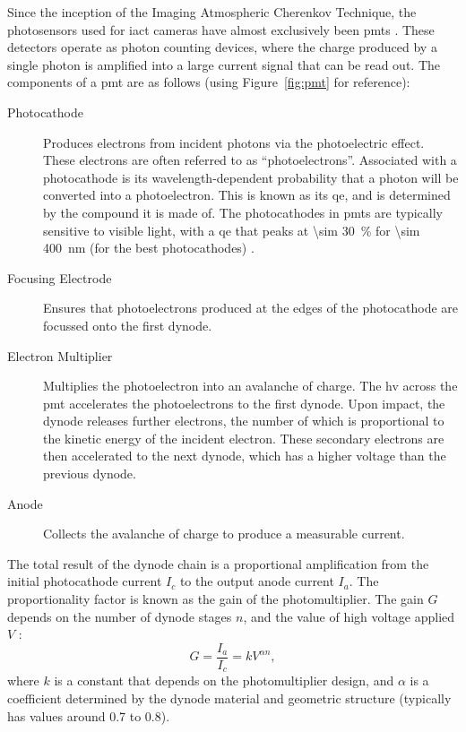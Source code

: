 Since the inception of the Imaging Atmospheric Cherenkov Technique, the photosensors used for \gls{iact} cameras have almost exclusively been \glspl{pmt} \cite{Weekes2003}. These detectors operate as photon counting devices, where the charge produced by a single photon is amplified into a large current signal that can be read out. The components of a \gls{pmt} are as follows (using Figure~\ref{fig:pmt} for reference):
\begin{description}
\item [Photocathode] Produces electrons from incident photons via the photoelectric effect. These electrons are often referred to as ``photoelectrons''. Associated with a photocathode is its wavelength-dependent probability that a photon will be converted into a photoelectron. This is known as its \gls{qe}, and is determined by the compound it is made of. The photocathodes in \glspl{pmt} are typically sensitive to visible light, with a \gls{qe} that peaks at \SI{\sim 30}{\percent} for \SI{\sim 400}{nm} (for the best photocathodes) \cite{Hamamatsu2016}.
\item [Focusing Electrode] Ensures that photoelectrons produced at the edges of the photocathode are focussed onto the first dynode.
\item [Electron Multiplier] Multiplies the photoelectron into an avalanche of charge. The \gls{hv} across the \gls{pmt} accelerates the photoelectrons to the first dynode. Upon impact, the dynode releases further electrons, the number of which is proportional to the kinetic energy of the incident electron. These secondary electrons are then accelerated to the next dynode, which has a higher voltage than the previous dynode.
\item [Anode] Collects the avalanche of charge to produce a measurable current. 
\end{description}

The total result of the dynode chain is a proportional amplification from the initial photocathode current $I_c$ to the output anode current $I_a$. The proportionality factor is known as the gain of the photomultiplier. The gain $G$ depends on the number of dynode stages $n$, and the value of high voltage applied $V$ \cite{Hamamatsu2016}:
\begin{equation} \label{eq:pmt_gain}
G = \frac{I_a}{I_c} = k V^{\alpha n},
\end{equation}
where $k$ is a constant that depends on the photomultiplier design, and $\alpha$ is a coefficient determined by the dynode material and geometric structure (typically has values around 0.7 to 0.8).

